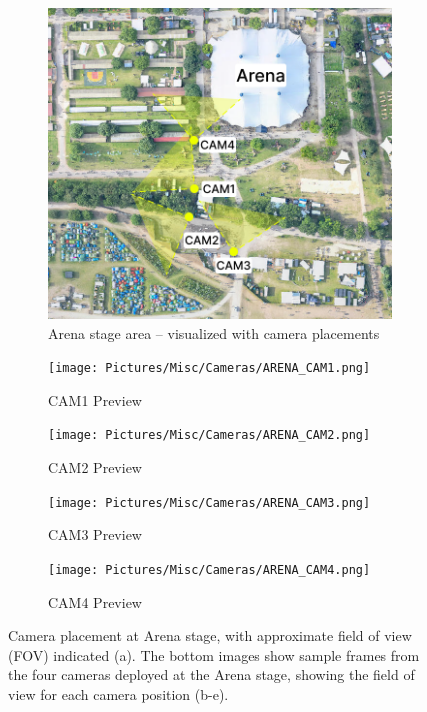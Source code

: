 \begin{figure}[htb!]
  \centering
  \begin{subfigure}{0.8\textwidth}
    \centering
    \includegraphics[width=\textwidth]{Pictures/Figures/arena_cameras.png}
    \caption{Arena stage area -- visualized with camera placements}

  \end{subfigure}
  \begin{subfigure}{0.37\textwidth}
    \centering
    \texttt{[image: Pictures/Misc/Cameras/ARENA\_CAM1.png]}
    \caption{CAM1 Preview}
  \end{subfigure}%
  \hspace{0.06\textwidth}
  \begin{subfigure}{0.37\textwidth}
    \centering
    \texttt{[image: Pictures/Misc/Cameras/ARENA\_CAM2.png]}
    \caption{CAM2 Preview}
  \end{subfigure}

  \begin{subfigure}{0.37\textwidth}
    \centering
    \texttt{[image: Pictures/Misc/Cameras/ARENA\_CAM3.png]}
    \caption{CAM3 Preview}
  \end{subfigure}%
  \hspace{0.06\textwidth}
  \begin{subfigure}{0.37\textwidth}
    \centering
    \texttt{[image: Pictures/Misc/Cameras/ARENA\_CAM4.png]}
    \caption{CAM4 Preview}
  \end{subfigure}

  \caption{Camera placement at Arena stage, with approximate field of view (FOV) indicated (a). The bottom images show sample frames from the four cameras deployed at the Arena stage, showing the field of view for each camera position (b-e).}
  \label{fig:arena_cameras}

\end{figure}


